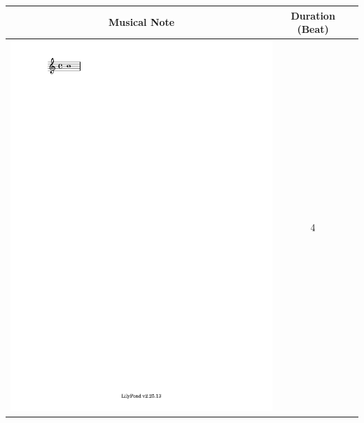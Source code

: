 \documentclass[11pt]{article}
\theoremstyle{definition}
\begin{document}
\begin{table}
\centering
\begin{tabular}{|c|c|c|}
\hline
\textbf{Musical Note} & \textbf{Duration (Beat)} \\
\hline
\includegraphics[trim=4.29cm 27.25cm 16cm 1.5cm, clip, scale=1]{whole_note.pdf} & 4  \\
\hline

\end{tabular}
\end{table}
\end{document}
